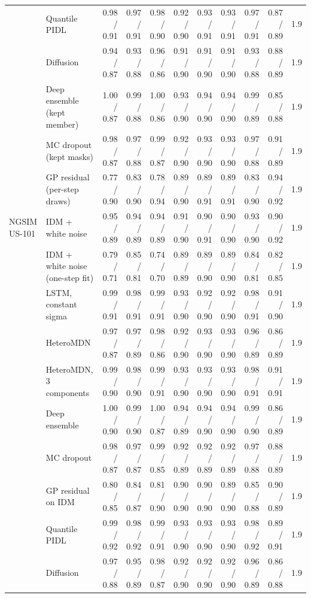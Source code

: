 \begin{longtable}{llrrrrrrrrr}
 & Quantile PIDL & 0.98 / 0.91 & 0.97 / 0.91 & 0.98 / 0.90 & 0.92 / 0.90 & 0.93 / 0.91 & 0.93 / 0.91 & 0.97 / 0.91 & 0.87 / 0.89 & 1.9 \\
 & Diffusion & 0.94 / 0.87 & 0.93 / 0.88 & 0.96 / 0.86 & 0.91 / 0.90 & 0.91 / 0.90 & 0.91 / 0.90 & 0.93 / 0.88 & 0.88 / 0.89 & 1.9 \\
 & Deep ensemble (kept member) & 1.00 / 0.87 & 0.99 / 0.88 & 1.00 / 0.86 & 0.93 / 0.90 & 0.94 / 0.90 & 0.94 / 0.90 & 0.99 / 0.89 & 0.85 / 0.88 & 1.9 \\
 & MC dropout (kept masks) & 0.98 / 0.87 & 0.97 / 0.88 & 0.99 / 0.87 & 0.92 / 0.90 & 0.93 / 0.90 & 0.93 / 0.90 & 0.97 / 0.88 & 0.91 / 0.89 & 1.9 \\
 & GP residual (per-step draws) & 0.77 / 0.90 & 0.83 / 0.90 & 0.78 / 0.94 & 0.89 / 0.90 & 0.89 / 0.91 & 0.89 / 0.91 & 0.83 / 0.90 & 0.94 / 0.92 & 1.9 \\
\midrule
NGSIM US-101 & IDM + white noise & 0.95 / 0.89 & 0.94 / 0.89 & 0.94 / 0.89 & 0.91 / 0.90 & 0.90 / 0.91 & 0.90 / 0.90 & 0.93 / 0.90 & 0.90 / 0.92 & 1.9 \\
 & IDM + white noise (one-step fit) & 0.79 / 0.71 & 0.85 / 0.81 & 0.74 / 0.70 & 0.89 / 0.89 & 0.89 / 0.90 & 0.89 / 0.90 & 0.84 / 0.81 & 0.82 / 0.85 & 1.9 \\
 & LSTM, constant sigma & 0.99 / 0.91 & 0.98 / 0.91 & 0.99 / 0.91 & 0.93 / 0.90 & 0.92 / 0.90 & 0.92 / 0.90 & 0.98 / 0.91 & 0.91 / 0.90 & 1.9 \\
 & HeteroMDN & 0.97 / 0.87 & 0.97 / 0.89 & 0.98 / 0.86 & 0.92 / 0.90 & 0.93 / 0.90 & 0.93 / 0.90 & 0.96 / 0.89 & 0.86 / 0.89 & 1.9 \\
 & HeteroMDN, 3 components & 0.99 / 0.90 & 0.98 / 0.90 & 0.99 / 0.91 & 0.93 / 0.90 & 0.93 / 0.90 & 0.93 / 0.90 & 0.98 / 0.91 & 0.91 / 0.91 & 1.9 \\
 & Deep ensemble & 1.00 / 0.90 & 0.99 / 0.90 & 1.00 / 0.87 & 0.94 / 0.89 & 0.94 / 0.90 & 0.94 / 0.90 & 0.99 / 0.90 & 0.86 / 0.89 & 1.9 \\
 & MC dropout & 0.98 / 0.87 & 0.97 / 0.87 & 0.99 / 0.85 & 0.92 / 0.89 & 0.92 / 0.89 & 0.92 / 0.89 & 0.97 / 0.88 & 0.88 / 0.89 & 1.9 \\
 & GP residual on IDM & 0.80 / 0.85 & 0.84 / 0.87 & 0.81 / 0.90 & 0.90 / 0.90 & 0.90 / 0.90 & 0.89 / 0.90 & 0.85 / 0.88 & 0.90 / 0.89 & 1.9 \\
 & Quantile PIDL & 0.99 / 0.92 & 0.98 / 0.92 & 0.99 / 0.91 & 0.93 / 0.90 & 0.93 / 0.90 & 0.93 / 0.90 & 0.98 / 0.92 & 0.89 / 0.91 & 1.9 \\
 & Diffusion & 0.97 / 0.88 & 0.95 / 0.89 & 0.98 / 0.87 & 0.92 / 0.90 & 0.92 / 0.90 & 0.92 / 0.90 & 0.96 / 0.89 & 0.86 / 0.88 & 1.9 \\

\end{longtable}
